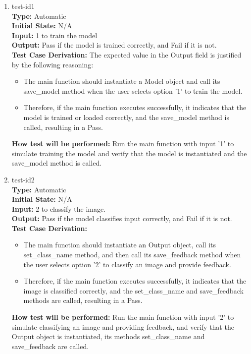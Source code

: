 \documentclass[12pt, titlepage]{article}
\begin{document}
\begin{enumerate}
  \item{test-id1\\}
  \textbf{Type:} Automatic \\
  \textbf{Initial State:} N/A \\
  \textbf{Input:} 1 to train the model \\
  \textbf{Output:} Pass if the model is trained correctly, and Fail if it is not. \\
  \textbf{Test Case Derivation:} 
  The expected value in the Output field is justified by the following reasoning:
  \begin{itemize}
      \item The main function should instantiate a Model object and call its save\_model 
      method when the user selects option '1' to train the model.
      \item Therefore, if the main function executes successfully, it indicates that the 
      model is trained or loaded correctly, and the save\_model method is called, resulting in a Pass.
  \end{itemize}
  \textbf{How test will be performed:} 
  Run the main function with input '1' to simulate training the model and verify that the 
  model is instantiated and the save\_model method is called.

  \item{test-id2\\}
  \textbf{Type:} Automatic \\
  \textbf{Initial State:} N/A \\
  \textbf{Input:} 2 to classify the image. \\
  \textbf{Output:} Pass if the model classifies input correctly, and Fail if it is not. \\
  \textbf{Test Case Derivation:} 
  \begin{itemize}
      \item The main function should instantiate an Output object, call its set\_class\_name 
      method, and then call its save\_feedback method when the user selects option '2' to 
      classify an image and provide feedback.
      \item Therefore, if the main function executes successfully, it indicates that the 
      image is classified correctly, and the set\_class\_name and save\_feedback methods are called, resulting in a Pass.
  \end{itemize}
  \textbf{How test will be performed:} 
  Run the main function with input '2' to simulate classifying an image and providing 
  feedback, and verify that the Output object is instantiated, its methods set\_class\_name and save\_feedback are called.
\end{enumerate}
\end{document}
